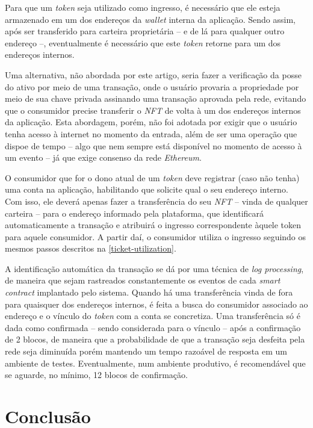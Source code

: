 {Para que um \textit{token} seja utilizado como ingresso, é necessário que ele esteja armazenado em um dos endereços da \textit{wallet} interna da aplicação. Sendo assim, após ser transferido para carteira proprietária -- e de lá para qualquer outro endereço --, eventualmente é necessário que este \textit{token} retorne para um dos endereços internos. 

Uma alternativa, não abordada por este artigo, seria fazer a verificação da posse do ativo por meio de uma transação, onde o usuário provaria a propriedade por meio de sua chave privada assinando uma transação aprovada pela rede, evitando que o consumidor precise transferir o \textit{NFT} de volta à um dos endereços internos da aplicação. Esta abordagem, porém, não foi adotada por exigir que o usuário tenha acesso à internet no momento da entrada, além de ser uma operação que dispoe de tempo -- algo que nem sempre está disponível no momento de acesso à um evento -- já que exige consenso da rede \textit{Ethereum}.

O consumidor que for o dono atual de um \textit{token} deve registrar (caso não tenha) uma conta na aplicação, habilitando que solicite qual o seu endereço interno. Com isso, ele deverá apenas fazer a transferência do seu \textit{NFT} -- vinda de qualquer carteira -- para o endereço informado pela plataforma, que identificará automaticamente a transação e atribuirá o ingresso correspondente àquele token para aquele consumidor. A partir daí, o consumidor utiliza o ingresso seguindo os mesmos passos descritos na \ref{ticket-utilization}.

A identificação automática da transação se dá por uma técnica de \textit{log processing}, de maneira que sejam rastreados constantemente os eventos de cada \textit{smart contract} implantado pelo sistema. Quando há uma transferência vinda de fora para quaisquer dos endereços internos, é feita a busca do consumidor associado ao endereço e o vínculo do \textit{token} com a conta se concretiza. Uma transferência só é dada como confirmada -- sendo considerada para o vínculo -- após a confirmação de 2 blocos, de maneira que a probabilidade de que a transação seja desfeita pela rede seja diminuída porém mantendo um tempo razoável de resposta em um ambiente de testes. Eventualmente, num ambiente produtivo, é recomendável que se aguarde, no mínimo, 12 blocos de confirmação.

\section{\esp Conclusão}

}

